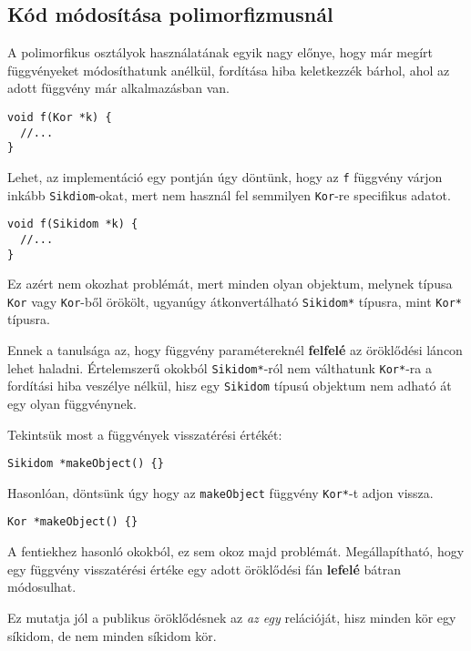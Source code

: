 \documentclass[../cpp_book/cpp_book.tex]{subfiles}
\begin{document}
	\subsection{Kód módosítása polimorfizmusnál}
	\smallskip
	A polimorfikus osztályok használatának egyik nagy előnye, hogy már megírt függvényeket módosíthatunk anélkül, fordítása hiba keletkezzék bárhol, ahol az adott függvény már alkalmazásban van.
	\begin{lstlisting}
void f(Kor *k) {
  //...
}
	\end{lstlisting}
	Lehet, az implementáció egy pontján úgy döntünk, hogy az \texttt{f} függvény várjon inkább \texttt{Sikdiom}-okat, mert nem használ fel semmilyen \texttt{Kor}-re specifikus adatot.
	\begin{lstlisting}
void f(Sikidom *k) {
  //...
}
	\end{lstlisting}
	Ez azért nem okozhat problémát, mert minden olyan objektum, melynek típusa \texttt{Kor} vagy \texttt{Kor}-ből örökölt, ugyanúgy átkonvertálható \texttt{Sikidom*} típusra, mint \texttt{Kor*} típusra.
	
	Ennek a tanulsága az, hogy függvény paramétereknél \textbf{felfelé} az öröklődési láncon lehet haladni. Értelemszerű okokból \texttt{Sikidom*}-ról nem válthatunk \texttt{Kor*}-ra a fordítási hiba veszélye nélkül, hisz egy \texttt{Sikidom} típusú objektum nem adható át egy olyan függvénynek.
	
	\medskip
	Tekintsük most a függvények visszatérési értékét:
	\begin{lstlisting}
Sikidom *makeObject() {}
	\end{lstlisting}
	Hasonlóan, döntsünk úgy hogy az \texttt{makeObject} függvény \texttt{Kor*}-t adjon vissza.
	\begin{lstlisting}
Kor *makeObject() {}
	\end{lstlisting}
	A fentiekhez hasonló okokból, ez sem okoz majd problémát. Megállapítható, hogy egy függvény visszatérési értéke egy adott öröklődési fán \textbf{lefelé} bátran módosulhat.
	\begin{note}
		Ez mutatja jól a publikus öröklődésnek az \textit{az egy} relációját, hisz minden kör egy síkidom, de nem minden síkidom kör.
	\end{note}
	
\end{document}
